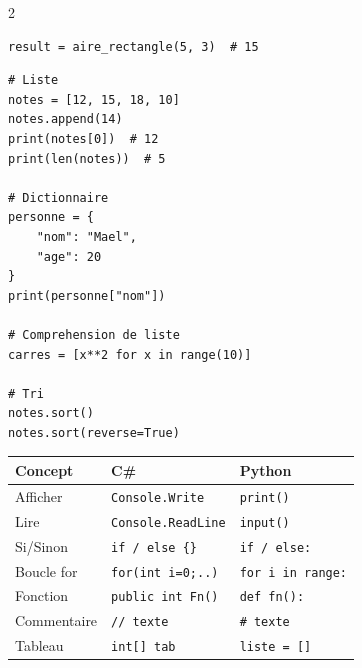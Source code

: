 \documentclass[a4paper,10pt]{article}
\begin{document}
\begin{multicols}{2}
\begin{tcolorbox}[basebox, colframe=teal, title=7. Python — Bases]
\begin{lstlisting}[style=python]
result = aire_rectangle(5, 3)  # 15
\end{lstlisting}
\end{tcolorbox}

\begin{tcolorbox}[basebox, colframe=teal, title=8. Python — Listes et structures]
\begin{lstlisting}[style=python]
# Liste
notes = [12, 15, 18, 10]
notes.append(14)
print(notes[0])  # 12
print(len(notes))  # 5

# Dictionnaire
personne = {
    "nom": "Mael",
    "age": 20
}
print(personne["nom"])

# Comprehension de liste
carres = [x**2 for x in range(10)]

# Tri
notes.sort()
notes.sort(reverse=True)
\end{lstlisting}
\end{tcolorbox}

\begin{tcolorbox}[basebox, colframe=orange, title=9. Comparaison Algorithme / C\# / Python]
\begin{tabularx}{\columnwidth}{lXX}
\toprule
\textbf{Concept} & \textbf{C\#} & \textbf{Python} \\
\midrule
Afficher & \texttt{Console.Write} & \texttt{print()} \\
Lire & \texttt{Console.ReadLine} & \texttt{input()} \\
Si/Sinon & \texttt{if / else \{\}} & \texttt{if / else:} \\
Boucle for & \texttt{for(int i=0;..)} & \texttt{for i in range:} \\
Fonction & \texttt{public int Fn()} & \texttt{def fn():} \\
Commentaire & \texttt{// texte} & \texttt{\# texte} \\
Tableau & \texttt{int[] tab} & \texttt{liste = []} \\
\bottomrule
\end{tabularx}
\end{tcolorbox}


\end{multicols}
\end{document}
